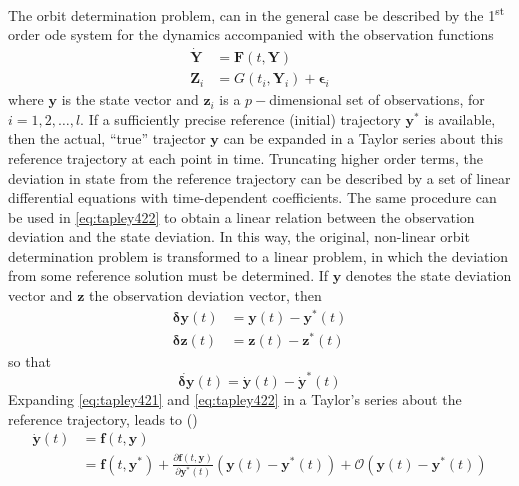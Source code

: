The orbit determination problem, can in the general case be described by the 
1\textsuperscript{st} order \gls{ode} system for the dynamics accompanied with 
the observation functions
\begin{align}
  \bm{\dot{Y}} &= \bm{F}(t, \bm{Y}) \label{eq:tapley421} \\
  \bm{Z}_i     &=  G(t_i, \bm{Y}_i) + \bm{\epsilon}_i \label{eq:tapley422}
\end{align}
where $\bm{y}$ is the state vector and $\bm{z}_i$ is a $p-$dimensional set of 
observations, for $i=1,2,\dots ,l$. If a sufficiently precise reference (initial) 
trajectory $\bm{y}^{*}$ is available, then the actual, ``true'' trajector $\bm{y}$ 
can be expanded in a Taylor series about this reference trajectory at each point 
in time. Truncating higher order terms, the deviation in state from the 
reference trajectory can be described by a set of linear differential equations 
with time-dependent coefficients. The same procedure can be used in \autoref{eq:tapley422} 
to obtain a linear relation between the observation deviation and the state deviation.
In this way, the original, non-linear orbit determination problem is transformed 
to a linear problem, in which the deviation from some reference solution must be
determined.
If $\bm{y}$ denotes the state deviation vector and $\bm{z}$ the observation deviation 
vector, then
\begin{equation}
  \begin{aligned}
    \bm{\delta y}(t) &= \bm{y}(t) - \bm{y}^{*}(t) \\
    \bm{\delta z}(t) &= \bm{z}(t) - \bm{z}^{*}(t)
  \end{aligned}
\end{equation}
so that
\begin{equation}\label{eq:tapley424}
  \dot{\bm{\delta y}}(t) = \dot{\bm{y}}(t) - \dot{\bm{y}}^{*}(t)
\end{equation}
Expanding \autoref{eq:tapley421} and \autoref{eq:tapley422} in a Taylor's series 
about the reference trajectory, leads to (\cite{Tapley2004})
\begin{equation}\label{eq:tapley425a}
  \begin{aligned}
  \bm{\dot{y}}(t) &= \bm{f}(t, \bm{y}) \\
                  &= \bm{f}(t, \bm{y}^{*}) + 
                  \frac{\partial \bm{f}(t, \bm{y})}{\partial \bm{y}^{*}(t)} 
                  \left( \bm{y}(t) - \bm{y}^{*}(t) \right) 
                  + \mathcal{O}\left( \bm{y}(t) - \bm{y}^{*}(t) \right)
  \end{aligned}
\end{equation}
